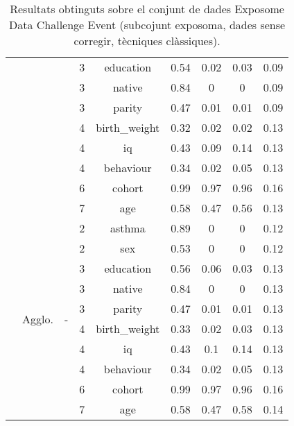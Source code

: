 \documentclass[CAT,BIB]{TFUOC}%
\begin{document}
\begin{table}
\begin{tabular}{@{}ccccccccc@{}}
            &  &  & 3 & education & 0.54 & 0.02 & 0.03 & 0.09 \\
            &  &  & 3 & native & 0.84 & 0 & 0 & 0.09 \\
            &  &  & 3 & parity & 0.47 & 0.01 & 0.01 & 0.09 \\
            &  &  & 4 & birth\_weight & 0.32 & 0.02 & 0.02 & 0.13 \\
            &  &  & 4 & iq & 0.43 & 0.09 & 0.14 & 0.13 \\
            &  &  & 4 & behaviour & 0.34 & 0.02 & 0.05 & 0.13 \\
            &  &  & 6 & cohort & 0.99 & 0.97 & 0.96 & 0.16 \\
            &  &  & 7 & age & 0.58 & 0.47 & 0.56 & 0.13 \\ \cmidrule(l){2-9}
            & \multirow{10}{*}{Agglo.} & \multirow{10}{*}{-} & 2 & asthma & 0.89 & 0 & 0 & 0.12 \\
            &  &  & 2 & sex & 0.53 & 0 & 0 & 0.12 \\
            &  &  & 3 & education & 0.56 & 0.06 & 0.03 & 0.13 \\
            &  &  & 3 & native & 0.84 & 0 & 0 & 0.13 \\
            &  &  & 3 & parity & 0.47 & 0.01 & 0.01 & 0.13 \\
            &  &  & 4 & birth\_weight & 0.33 & 0.02 & 0.03 & 0.13 \\
            &  &  & 4 & iq & 0.43 & 0.1 & 0.14 & 0.13 \\
            &  &  & 4 & behaviour & 0.34 & 0.02 & 0.05 & 0.13 \\
            &  &  & 6 & cohort & 0.99 & 0.97 & 0.96 & 0.16 \\
            &  &  & 7 & age & 0.58 & 0.47 & 0.58 & 0.14 \\ \bottomrule
        \end{tabular}
        \caption[Exposome Data Challenge Event: resultats - part 7]{
            Resultats obtinguts sobre el conjunt de dades Exposome Data Challenge Event
            (subcojunt exposoma, dades sense corregir, tècniques clàssiques).
        }
        \label{t:results_exposome7}
    \end{table}
\end{document}
